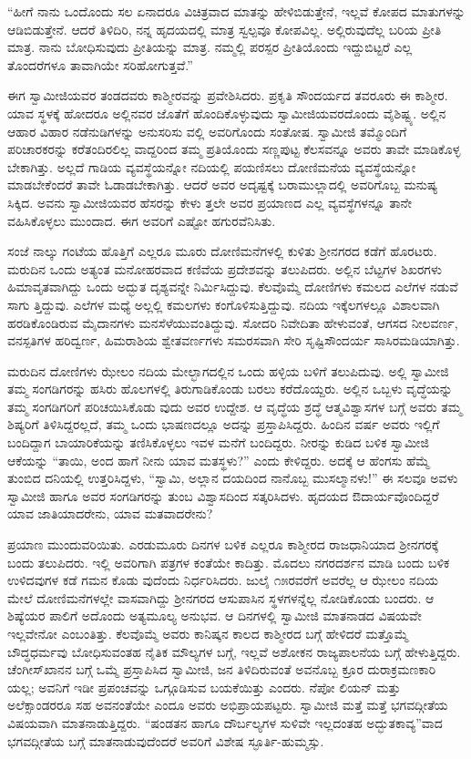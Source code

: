 “ಹೀಗೆ ನಾನು ಒಂದೊಂದು ಸಲ ಏನಾದರೂ ವಿಚಿತ್ರವಾದ ಮಾತನ್ನು ಹೇಳಿಬಿಡುತ್ತೇನೆ, ಇಲ್ಲವೆ ಕೋಪದ ಮಾತುಗಳನ್ನು ಆಡಿಬಿಡುತ್ತೇನೆ. ಆದರೆ ತಿಳಿದಿರಿ, ನನ್ನ ಹೃದಯದಲ್ಲಿ ಮಾತ್ರ ಸ್ವಲ್ಪವೂ ಕೋಪವಿಲ್ಲ. ಅಲ್ಲಿರುವುದೆಲ್ಲ ಬರಿಯ ಪ್ರೀತಿ ಮಾತ್ರ. ನಾನು ಬೋಧಿಸುವುದು ಪ್ರೀತಿಯನ್ನು ಮಾತ್ರ. ನಮ್ಮಲ್ಲಿ ಪರಸ್ಪರ ಪ್ರೀತಿಯೊಂದು ಇದ್ದುಬಿಟ್ಟರೆ ಎಲ್ಲ ತೊಂದರೆಗಳೂ ತಾವಾಗಿಯೇ ಸರಿಹೋಗುತ್ತವೆ.”

ಈಗ ಸ್ವಾಮೀಜಿಯವರ ತಂಡದವರು ಕಾಶ್ಮೀರವನ್ನು ಪ್ರವೇಶಿಸಿದರು. ಪ್ರಕೃತಿ ಸೌಂದರ್ಯದ ತವರೂರು ಈ ಕಾಶ್ಮೀರ. ಯಾವ ಸ್ಥಳಕ್ಕೆ ಹೋದರೂ ಅಲ್ಲಿನವರ ಜೊತೆಗೆ ಹೊಂದಿಕೊಳ್ಳುವುದು ಸ್ವಾಮೀಜಿಯವರದೊಂದು ವೈಶಿಷ್ಟ್ಯ. ಅಲ್ಲಿನ ಆಹಾರ ವಿಹಾರ ನಡೆನುಡಿಗಳನ್ನು ಅನುಸರಿಸು ವಲ್ಲಿ ಅವರಿಗೊಂದು ಸಂತೋಷ. ಸ್ವಾಮೀಜಿ ತಮ್ಮೊಂದಿಗೆ ಪರಿಚಾರಕರನ್ನು ಕರೆತಂದಿರಲಿಲ್ಲ ವಾದ್ದರಿಂದ ತಮ್ಮ ಪ್ರತಿಯೊಂದು ಸಣ್ಣಪುಟ್ಟ ಕೆಲಸವನ್ನೂ ಅವರು ತಾವೇ ಮಾಡಿಕೊಳ್ಳ ಬೇಕಾಗಿತ್ತು. ಅಲ್ಲದೆ ಗಾಡಿಯ ವ್ಯವಸ್ಥೆಯನ್ನೋ ನದಿಯಲ್ಲಿ ಪಯಣಿಸಲು ದೋಣಿಮನೆಯ ವ್ಯವಸ್ಥೆಯನ್ನೋ ಮಾಡಬೇಕೆಂದರೆ ತಾವೇ ಓಡಾಡಬೇಕಾಗಿತ್ತು. ಆದರೆ ಅವರ ಅದೃಷ್ಟಕ್ಕೆ ಬರಾಮುಲ್ಲಾದಲ್ಲಿ ಅವರಿಗೊಬ್ಬ ಮನುಷ್ಯ ಸಿಕ್ಕಿದ. ಅವನು ಸ್ವಾಮೀಜಿಯವರ ಹೆಸರನ್ನು ಕೇಳು ತ್ತಲೇ ಅವರ ಪ್ರಯಾಣದ ಎಲ್ಲ ವ್ಯವಸ್ಥೆಗಳನ್ನೂ ತಾನೇ ವಹಿಸಿಕೊಳ್ಳಲು ಮುಂದಾದ. ಈಗ ಅವರಿಗೆ ಎಷ್ಟೋ ಹಗುರವೆನಿಸಿತು.

ಸಂಜೆ ನಾಲ್ಕು ಗಂಟೆಯ ಹೊತ್ತಿಗೆ ಎಲ್ಲರೂ ಮೂರು ದೋಣಿಮನೆಗಳಲ್ಲಿ ಕುಳಿತು ಶ್ರೀನಗರದ ಕಡೆಗೆ ಹೊರಟರು. ಮರುದಿನ ಒಂದು ಅತ್ಯಂತ ಮನೋಹರವಾದ ಕಣಿವೆಯ ಪ್ರದೇಶವನ್ನು ತಲುಪಿದರು. ಅಲ್ಲಿನ ಬೆಟ್ಟಗಳ ಶಿಖರಗಳು ಹಿಮಾವೃತವಾಗಿದ್ದು ಒಂದು ಅದ್ಭುತ ದೃಶ್ಯವನ್ನೇ ನಿರ್ಮಿಸಿದ್ದುವು. ಕೆಲವೊಮ್ಮೆ ದೋಣಿಗಳು ಕಮಲದ ಎಲೆಗಳ ನಡುವೆ ಸಾಗು ತ್ತಿದ್ದುವು. ಎಲೆಗಳ ಮಧ್ಯೆ ಅಲ್ಲಲ್ಲಿ ಕಮಲಗಳು ಕಂಗೊಳಿಸುತ್ತಿದ್ದುವು. ನದಿಯ ಇಕ್ಕೆಲಗಳಲ್ಲೂ ವಿಶಾಲವಾಗಿ ಹರಡಿಕೊಂಡಿರುವ ಮೈದಾನಗಳು ಮನಸೆಳೆಯುವಂತಿದ್ದುವು. ಸೋದರಿ ನಿವೇದಿತಾ ಹೇಳುವಂತೆ, ಆಗಸದ ನೀಲವರ್ಣ, ವನಸ್ಪತಿಗಳ ಹರಿದ್ವರ್ಣ, ಹಿಮರಾಶಿಯ ಶ್ವೇತವರ್ಣಗಳು ಸಮರಸವಾಗಿ ಸೇರಿ ಸೃಷ್ಟಿಸೌಂದರ್ಯ ಸಾಸಿರಮಡಿಯಾಗಿತ್ತು.

ಮರುದಿನ ದೋಣಿಗಳು ಝೇಲಂ ನದಿಯ ಮೇಲ್ಭಾಗದಲ್ಲಿನ ಒಂದು ಹಳ್ಳಿಯ ಬಳಿಗೆ ತಲುಪಿದುವು. ಅಲ್ಲಿ ಸ್ವಾಮೀಜಿ ತಮ್ಮ ಸಂಗಡಿಗರನ್ನು ಹಸಿರು ಹೊಲಗಳಲ್ಲಿ ತಿರುಗಾಡಿಕೊಂಡು ಬರಲು ಕರೆದೊಯ್ದರು. ಅಲ್ಲಿನ ಒಬ್ಬಳು ವೃದ್ಧೆಯನ್ನು ತಮ್ಮ ಸಂಗಡಿಗರಿಗೆ ಪರಿಚಯಿಸಿಕೊಡು ವುದು ಅವರ ಉದ್ದೇಶ. ಆ ವೃದ್ಧೆಯ ಶ್ರದ್ಧೆ ಆತ್ಮವಿಶ್ವಾಸಗಳ ಬಗ್ಗೆ ಅವರು ತಮ್ಮ ಶಿಷ್ಯರಿಗೆ ತಿಳಿಸಿದ್ದರಲ್ಲದೆ, ತಮ್ಮ ಒಂದು ಭಾಷಣದಲ್ಲೂ ಅದನ್ನು ಪ್ರಸ್ತಾಪಿಸಿದ್ದರು. ಹಿಂದಿನ ವರ್ಷ ಅವರು ಇಲ್ಲಿಗೆ ಬಂದಿದ್ದಾಗ ಬಾಯಾರಿಕೆಯನ್ನು ತಣಿಸಿಕೊಳ್ಳಲು ಇವಳ ಮನೆಗೆ ಬಂದಿದ್ದರು. ನೀರನ್ನು ಕುಡಿದ ಬಳಿಕ ಸ್ವಾಮೀಜಿ ಆಕೆಯನ್ನು “ತಾಯಿ, ಅಂದ ಹಾಗೆ ನೀನು ಯಾವ ಮತಸ್ಥಳು?” ಎಂದು ಕೇಳಿದ್ದರು. ಅದಕ್ಕೆ ಆ ಹೆಂಗಸು ಹೆಮ್ಮೆ ತುಂಬಿದ ದನಿಯಲ್ಲಿ ಉತ್ತರಿಸಿದ್ದಳು, “ಸ್ವಾಮಿ, ಅಲ್ಲಾನ ದಯದಿಂದ ನಾನೊಬ್ಬ ಮುಸಲ್ಮಾನಳು!” ಈ ಸಲವೂ ಅವಳು ಸ್ವಾಮೀಜಿ ಹಾಗೂ ಅವರ ಸಂಗಡಿಗರನ್ನು ತುಂಬ ವಿಶ್ವಾಸದಿಂದ ಸತ್ಕರಿಸಿದಳು. ಹೃದಯದ ಔದಾರ್ಯವೊಂದಿದ್ದರೆ ಯಾವ ಜಾತಿಯಾದರೇನು, ಯಾವ ಮತವಾದರೇನು?

ಪ್ರಯಾಣ ಮುಂದುವರಿಯಿತು. ಎರಡುಮೂರು ದಿನಗಳ ಬಳಿಕ ಎಲ್ಲರೂ ಕಾಶ್ಮೀರದ ರಾಜಧಾನಿಯಾದ ಶ್ರೀನಗರಕ್ಕೆ ಬಂದು ತಲುಪಿದರು. ಇಲ್ಲಿ ಅವರಿಗಾಗಿ ಪತ್ರಗಳ ಕಂತೆಯೇ ಕಾದಿತ್ತು. ಮೊದಲು ನಗರದರ್ಶನ ಮಾಡಿ ಬಂದು ಬಳಿಕ ಉಳಿದವುಗಳ ಕಡೆ ಗಮನ ಕೊಡು ವುದೆಂದು ನಿರ್ಧರಿಸಿದರು. ಜುಲೈ ೧೫ರವರೆಗೆ ಅವರೆಲ್ಲ ಆ ಝೇಲಂ ನದಿಯ ಮೇಲೆ ದೋಣಿಮನೆಗಳಲ್ಲೇ ವಾಸವಾಗಿದ್ದು ಶ್ರೀನಗರದ ಆಸುಪಾಸಿನ ಸ್ಥಳಗಳನ್ನೆಲ್ಲ ನೋಡಿಕೊಂಡು ಬಂದರು. ಆ ಶಿಷ್ಯೆಯರ ಪಾಲಿಗೆ ಅದೊಂದು ಅತ್ಯಮೂಲ್ಯ ಅನುಭವ. ಆ ದಿನಗಳಲ್ಲಿ ಸ್ವಾಮೀಜಿ ಮಾತನಾಡದ ವಿಷಯವೇ ಇಲ್ಲವೇನೋ ಎಂಬಂತಿತ್ತು. ಕೆಲವೊಮ್ಮೆ ಅವರು ಕಾನಿಷ್ಕನ ಕಾಲದ ಕಾಶ್ಮೀರದ ಬಗ್ಗೆ ಹೇಳಿದರೆ ಮತ್ತೊಮ್ಮೆ ಬೌದ್ಧಧರ್ಮವು ಬೋಧಿಸುವಂತಹ ನೈತಿಕ ಮೌಲ್ಯಗಳ ಬಗ್ಗೆ, ಇಲ್ಲವೆ ಅಶೋಕನ ರಾಜ್ಯಪಾಲನೆಯ ಬಗ್ಗೆ ಹೇಳುತ್ತಿದ್ದರು. ಚೆಂಗೀಸ್​ಖಾನನ ಬಗ್ಗೆ ಒಮ್ಮೆ ಪ್ರಸ್ತಾಪಿಸಿದ ಸ್ವಾಮೀಜಿ, ಜನ ತಿಳಿದಿರುವಂತೆ ಅವನೊಬ್ಬ ಕ್ರೂರ ದುರಾಕ್ರಮಣಕಾರಿ ಯಲ್ಲ; ಅವನಿಗೆ ಇಡೀ ಪ್ರಪಂಚವನ್ನು ಒಗ್ಗೂಡಿಸುವ ಬಯಕೆಯಿತ್ತು ಎಂದರು. ನೆಪೋ ಲಿಯನ್ ಮತ್ತು ಅಲೆಕ್ಸಾಂಡರರೂ ಸಹ ಅವನಂತೆಯೇ ಎಂದೂ ಅವರು ಅಭಿಪ್ರಾಯಪಟ್ಟರು. ಸ್ವಾಮೀಜಿ ಮತ್ತೆ ಮತ್ತೆ ಭಗವದ್ಗೀತೆಯ ವಿಷಯವಾಗಿ ಮಾತನಾಡುತ್ತಿದ್ದರು. “ಷಂಡತನ ಹಾಗೂ ದೌರ್ಬಲ್ಯಗಳ ಸುಳಿವೇ ಇಲ್ಲದಂತಹ ಅದ್ಭುತಕಾವ್ಯ”ವಾದ ಭಗವದ್ಗೀತೆಯ ಬಗ್ಗೆ ಮಾತನಾಡುವುದೆಂದರೆ ಅವರಿಗೆ ವಿಶೇಷ ಸ್ಫೂರ್ತಿ-ಹುಮ್ಮಸ್ಸು.

